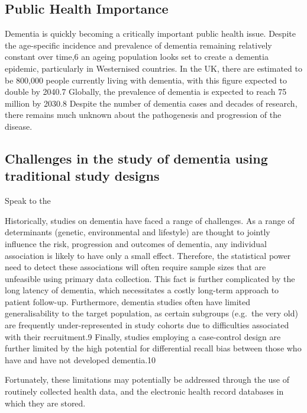 \documentclass[a4paper, twoside]{templates/ociamthesis}
\begin{document}
\hypertarget{public-health-importance}{%
\subsection{Public Health Importance}\label{public-health-importance}}

Dementia is quickly becoming a critically important public health issue. Despite the age-specific incidence and prevalence of dementia remaining relatively constant over time,6 an ageing population looks set to create a dementia epidemic, particularly in Westernised countries. In the UK, there are estimated to be 800,000 people currently living with dementia, with this figure expected to double by 2040.7 Globally, the prevalence of dementia is expected to reach 75 million by 2030.8 Despite the number of dementia cases and decades of research, there remains much unknown about the pathogenesis and progression of the disease.

\hypertarget{challenges-in-the-study-of-dementia-using-traditional-study-designs}{%
\subsection{Challenges in the study of dementia using traditional study designs}\label{challenges-in-the-study-of-dementia-using-traditional-study-designs}}

Speak to the

Historically, studies on dementia have faced a range of challenges. As a range of determinants (genetic, environmental and lifestyle) are thought to jointly influence the risk, progression and outcomes of dementia, any individual association is likely to have only a small effect. Therefore, the statistical power need to detect these associations will often require sample sizes that are unfeasible using primary data collection.
This fact is further complicated by the long latency of dementia, which necessitates a costly long-term approach to patient follow-up. Furthermore, dementia studies often have limited generalisability to the target population, as certain subgroups (e.g.~the very old) are frequently under-represented in study cohorts due to difficulties associated with their recruitment.9 Finally, studies employing a case-control design are further limited by the high potential for differential recall bias between those who have and have not developed dementia.10

Fortunately, these limitations may potentially be addressed through the use of routinely collected health data, and the electronic health record databases in which they are stored.
\end{document}
